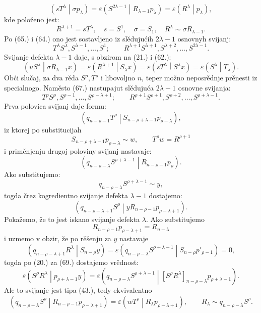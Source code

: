 \documentclass[11pt]{article}
\newcommand{\pair}[2]{\left(#1\middle|#2\right)}
\newcommand{\eps}{\varepsilon}
\begin{document}
\[
 \pair{sT^\lambda}{\sigma p_\lambda}
 =\eps\pair{S^{2\lambda-1}}{R_{\lambda-1}p_\lambda}
 =\eps\pair{R^\lambda}{p_\lambda},
\]
kde položeno jest:
\[
 R^{\lambda+1}=sT^\lambda,
 \quad s=S^1,
 \quad \sigma=S_1,
 \quad R^\lambda\sim\sigma R_{\lambda-1}.
\]
Po (65.) i (64.) ono jest sostavljeno iz slědujućih $2\lambda-1$ osnovnyh svijanj:
\begin{equation}
 T^\lambda S^\lambda,S^{\lambda-1},\ldots,S^1;
 \qquad R^{\lambda+1}S^{\lambda+1},S^{\lambda+2},\ldots,S^{2\lambda-1}.
\tag{67}
\end{equation}
Svijanje defekta $\lambda-1$ daje, s obzirom na (21.) i (62.):
\[
 \pair{uS^\lambda}{\sigma R_{\lambda-1}x}=\eps\pair{R^{\lambda+1}}{S_\lambda x}
 =\eps\pair{sT^\lambda}{S^\lambda x}=\eps\pair{S^\lambda}{T_\lambda}.
\]
Obći slučaj, za dva rěda $S^\rho,T^\rho$ i libovoljno $n$, teper možno neposrědnje prěnesti iz specialnogo. Naměsto (67.) nastupajut slědujuća $2\lambda-1$ osnovne svijanja:
\begin{equation}
 T^\rho S^\rho,S^{\rho-1},\ldots,S^{\rho-\lambda+1};
 \qquad R^{\rho+1}S^{\rho+1},S^{\rho+2},\ldots,S^{\rho+\lambda-1}.
\tag{68}
\end{equation}
Prva polovica svijanj daje formu:
\[
 \pair{q_{n-\rho-1}T^\rho}{S_{n-\rho+\lambda-1}p_{\rho-\lambda}},
\]
iz ktorej po substitucijah
\[
 S_{n-\rho+\lambda-1}p_{\rho-\lambda}\sim w,
 \qquad T^\rho w=R^{\rho+1}
\]
i priměnjenju drugoj poloviny svijanj nastavaje:
\[
 \pair{q_{n-\rho-\lambda}S^{\rho+\lambda-1}}{R_{n-\rho-1}p_\rho}.
\]
Ako substitujemo:
\[
 q_{n-\rho-\lambda}S^{\rho+\lambda-1}\sim y,
\]
togda črez kogredientno svijanje defekta $\lambda-1$ dostajemo:
\begin{equation}
 \pair{q_{n-\rho-\lambda+1}S^\rho}{yR_{n-\rho-1}p_{\rho-\lambda+1}}.
\tag{69}
\end{equation}
Pokažemo, že to jest iskano svijanje defekta $\lambda$. Ako substitujemo
\[
 R_{n-\rho-1}p_{\rho-\lambda+1}=R_{n-\lambda}
\]
i uzmemo v obzir, že po rěšenju za $y$ nastavaje
\[
 \pair{q_{n-\rho-\lambda+1}R^\lambda}{S_{n-\rho}y}
 =\eps\pair{q_{n-\rho-\lambda}S^{\rho+\lambda-1}}{S_{n-\rho}p'_{\rho-1}}=0,
\]
togda po (20.) za (69.) dostajemo vrědnost:
\[
 \eps\pair{S^\rho R^\lambda}{p_{\rho+\lambda-1}y}
 =\eps\pair{q_{n-\rho-\lambda}S^{\rho+\lambda-1}}{[S^\rho R^\lambda]_{n-\rho-\lambda}p_{\rho+\lambda-1}}.
\]
Ale to svijanje jest tipa (43.), tedy ekvivalentno
\[
 \pair{q_{n-\rho-\lambda}S^\rho}{R_{n-\rho-1}p_{\rho-\lambda+1}}
 =\eps\pair{wT^\rho}{R_\lambda p_{\rho-\lambda+1}},
 \qquad R_\lambda\sim q_{n-\rho-\lambda}S^\rho.
\]
\end{document}
